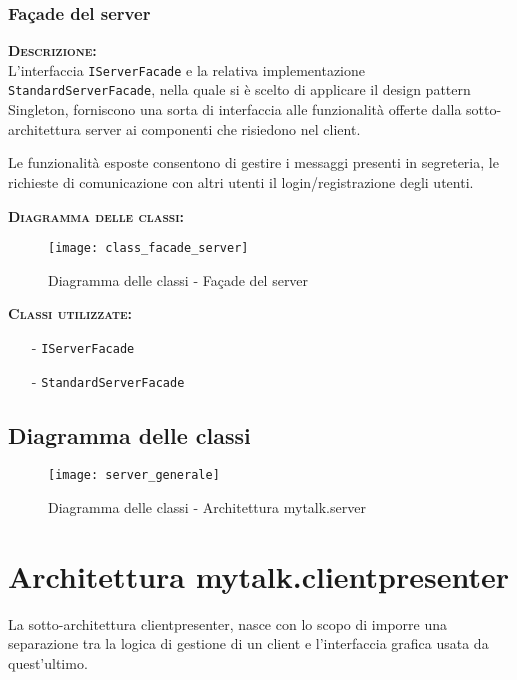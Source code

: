 \subsubsection{Façade del server}
\begin{description}
	\item{\scshape\bfseries Descrizione:}\\
L'interfaccia \texttt{IServerFacade} e la relativa implementazione \texttt{StandardServerFacade}, nella quale si è scelto di applicare il design pattern Singleton, forniscono una sorta di interfaccia alle funzionalità offerte dalla sotto-architettura server ai componenti che risiedono nel client.

Le funzionalità esposte consentono di gestire i messaggi presenti in segreteria, le richieste di comunicazione con altri utenti il login/registrazione degli utenti.
	\item{\scshape\bfseries Diagramma delle classi:}
\begin{figure}[H]
\begin{center}
\texttt{[image: class\_facade\_server]}
\caption{Diagramma delle classi - Façade del server}\label{fig:facade_server}
\end{center}
\end{figure}	
	
	\item{\scshape\bfseries Classi utilizzate:}\\
	\begin{itemize}[noitemsep,nolistsep]
	  \item[-] \texttt{IServerFacade}
	  \item[-] \texttt{StandardServerFacade}
	\end{itemize}
\end{description}


\subsection{Diagramma delle classi}
\begin{figure}[H]
\begin{center}
\texttt{[image: server\_generale]}
\caption{Diagramma delle classi - Architettura mytalk.server}\label{fig:server_generale}
\end{center}
\end{figure}
\clearpage

\section{Architettura mytalk.clientpresenter}
La sotto-architettura clientpresenter, nasce con lo scopo di imporre una separazione tra la logica di gestione di un client e l'interfaccia grafica usata da quest'ultimo.

